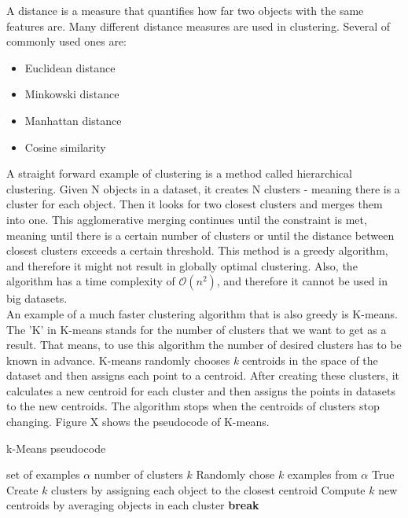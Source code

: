 \documentclass[thesis=B,english]{FITthesis}[2012/10/20]
\begin{document}
A distance is a measure that quantifies how far two objects with the same features are.
Many different distance measures are used in clustering.
Several of commonly used ones are:
\begin{itemize}
    \item Euclidean distance
    \item Minkowski distance
    \item Manhattan distance
    \item Cosine similarity
\end{itemize}

A straight forward example of clustering is a method called hierarchical clustering.
Given N objects in a dataset, it creates N clusters - meaning there is a cluster for each object.
Then it looks for two closest clusters and merges them into one.
This agglomerative merging continues until the constraint is met, meaning until there is a certain number of clusters or until the distance between closest clusters exceeds a certain threshold.
This method is a greedy algorithm, and therefore it might not result in globally optimal clustering.
Also, the algorithm has a time complexity of $\mathcal{O}(n^2)$, and therefore it cannot be used in big datasets. \\

An example of a much faster clustering algorithm that is also greedy is K-means. 
The 'K' in K-means stands for the number of clusters that we want to get as a result.
That means, to use this algorithm the number of desired clusters has to be known in advance.
K-means randomly chooses \textit{k} centroids in the space of the dataset and then assigns each point to a centroid.
After creating these clusters, it calculates a new centroid for each cluster and then assigns the points in datasets to the new centroids.
The algorithm stops when the centroids of clusters stop changing.
Figure X shows the pseudocode of K-means.
\begin{algorithm}
    \caption{k-Means pseudocode}
    \label{k_mean_pseudocode}
    \begin{algorithmic}[1]
        \INPUT set of examples $\alpha$  number of clusters $k$
        \STATE Randomly chose $k$ examples from $\alpha$
        \WHILE True
            \STATE Create $k$ clusters by assigning each object to the closest centroid
            \STATE Compute $k$ new centroids by averaging objects in each cluster
                \STATE \textbf{break}
            \ENDIF
        \ENDWHILE
    \end{algorithmic}
\end{algorithm}
\end{document}
